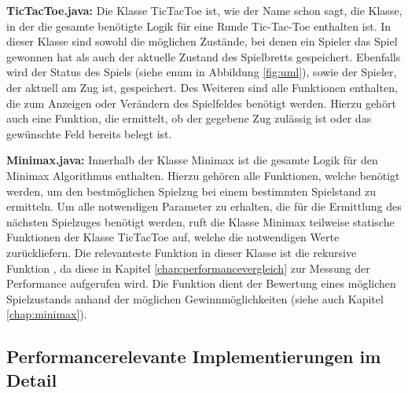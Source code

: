 \textbf{TicTacToe.java:} Die Klasse TicTacToe ist, wie der Name schon sagt, die Klasse, in der die gesamte benötigte Logik für eine Runde
Tic-Tac-Toe enthalten ist. In dieser Klasse sind sowohl die möglichen Zustände, bei denen ein Spieler das Spiel gewonnen hat als auch der
aktuelle Zustand des Spielbretts gespeichert. Ebenfalls wird der Status des Spiels (siehe enum in Abbildung \ref{fig:uml}), sowie der Spieler, der aktuell
am Zug ist, gespeichert. Des Weiteren sind alle Funktionen enthalten, die zum Anzeigen oder Verändern des Spielfeldes benötigt werden. Hierzu
gehört auch eine Funktion, die ermittelt, ob der gegebene Zug zulässig ist oder das gewünschte Feld bereits belegt ist.

\textbf{Minimax.java:} Innerhalb der Klasse Minimax ist die gesamte Logik für den Minimax Algorithmus enthalten. Hierzu gehören alle Funktionen,
welche benötigt werden, um den bestmöglichen Spielzug bei einem bestimmten Spielstand zu ermitteln. Um alle notwendigen Parameter zu erhalten,
die für die Ermittlung des nächsten Spielzuges benötigt werden, ruft die Klasse Minimax teilweise statische Funktionen der Klasse TicTacToe auf,
welche die notwendigen Werte zurückliefern. Die relevanteste Funktion in dieser Klasse ist die rekursive Funktion , 
da diese in Kapitel \ref{chap:performancevergleich} zur Messung der Performance aufgerufen wird. Die Funktion dient der Bewertung eines möglichen 
Spielzustands anhand der möglichen Gewinnmöglichkeiten (siehe auch Kapitel \ref{chap:minimax}).

\subsection{Performancerelevante Implementierungen im Detail}
\label{chap:implementierungen}

